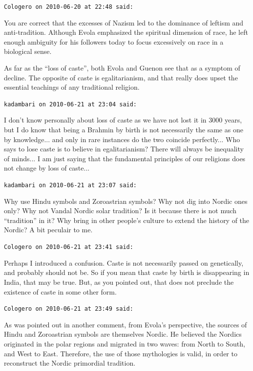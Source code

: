 \begin{footnotesize}
\begin{sffamily}
\hfill

\texttt{Cologero on 2010-06-20 at 22:48 said:}

You are correct that the excesses of Nazism led to the dominance of leftism and anti-tradition. Although Evola emphasized the spiritual dimension of race, he left enough ambiguity for his followers today to focus excessively on race in a biological sense.

As far as the ``loss of caste'', both Evola and Guenon see that as a symptom of decline. The opposite of caste is egalitarianism, and that really does upset the essential teachings of any traditional religion.

\hfill

\texttt{kadambari on 2010-06-21 at 23:04 said:}

I don't know personally about loss of caste as we have not lost it in 3000 years, but I do know that being a Brahmin by birth is not necessarily the same as one by knowledge... and only in rare instances do the two coincide perfectly... Who says to lose caste is to believe in egalitarianism? There will always be inequality of minds... I am just saying that the fundamental principles of our religions does not change by loss of caste... 

\hfill

\texttt{kadambari on 2010-06-21 at 23:07 said:}

Why use Hindu symbols and Zoroastrian symbols? Why not dig into Nordic ones only? Why not Vandal Nordic solar tradition? Is it because there is not much ``tradition'' in it? Why bring in other people's culture to extend the history of the Nordic? A bit peculair to me.

\hfill

\texttt{Cologero on 2010-06-21 at 23:41 said:}

Perhaps I introduced a confusion. Caste is not necessarily passed on genetically, and probably should not be. So if you mean that caste by birth is disappearing in India, that may be true. But, as you pointed out, that does not preclude the existence of caste in some other form.

\hfill

\texttt{Cologero on 2010-06-21 at 23:49 said:}

As was pointed out in another comment, from Evola's perspective, the sources of Hindu and Zoroastrian symbols are themselves Nordic. He believed the Nordics originated in the polar regions and migrated in two waves: from North to South, and West to East. Therefore, the use of those mythologies is valid, in order to reconstruct the Nordic primordial tradition.


\end{sffamily}
\end{footnotesize}
